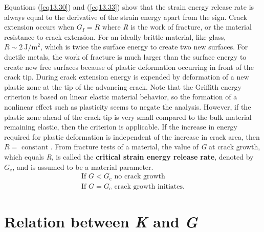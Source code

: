 \documentclass{AeroStructure-ERJohnson}
\begin{document}
Equations (\ref{eq13.30}) and (\ref{eq13.33}) show that the strain energy release rate is always equal to the derivative of the strain energy apart from the sign. Crack extension occurs when $G_{I}=R$ where \textit{R} is the work of fracture, or the material resistance to crack extension. For an ideally brittle material, like glass, $R \sim 2 \mathrm{~J} / \mathrm{m}^{2}$, which is twice the surface energy to create two new surfaces. For ductile metals, the work of fracture is much larger\vadjust{\vspace*{6pt}\pagebreak} than the surface energy to create new free surfaces because of plastic deformation occurring in front of the crack tip. During crack extension energy is expended by deformation of a new plastic zone at the tip of the advancing crack. Note that the Griffith energy criterion is based on linear elastic material behavior, so the formation of a nonlinear effect such as plasticity seems to negate the analysis. However, if the plastic zone ahead of the crack tip is very small compared to the bulk material remaining elastic, then the criterion is applicable. If the increase in energy required for plastic deformation is independent of the increase in crack area, then $R=\text { constant }$. From fracture tests of a material, the value of \textit{G} at crack growth, which equals \textit{R}, is called the \textbf{critical strain energy release} \textbf{rate}, denoted by $G_{\mathrm{c}}$, and is assumed to be a material parameter.
\begin{gather}
\textrm{If $G<G_{\mathrm{c}}$ no crack growth} \nonumber\\
\textrm{If $G=G_{\mathrm{c}}$ crack growth initiates.} \label{eq13.34}
\end{gather}

\section{Relation between \emph{K} and \emph{G}}\label{sec13.6}
\end{document}
